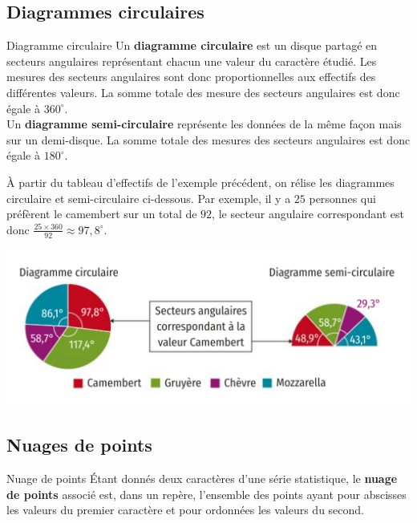 \documentclass[11pt]{article}
\begin{document}
\subsection{Diagrammes circulaires}
\begin{defi}{Diagramme circulaire}
  Un \textbf{diagramme circulaire} est un disque partagé en secteurs angulaires
  représentant chacun une valeur du caractère étudié. Les mesures des secteurs
  angulaires sont donc proportionnelles aux effectifs des différentes valeurs.
  La somme totale des mesure des secteurs angulaires est donc égale à
  $360^\circ$.\\[2mm]
  Un \textbf{diagramme semi-circulaire} représente les données de la même façon
  mais sur un demi-disque. La somme totale des mesures des secteurs angulaires
  est donc égale à $180^\circ$.
\end{defi}

\begin{exemple}
  À partir du tableau d'effectifs de l'exemple précédent, on rélise les
  diagrammes circulaire et semi-circulaire ci-dessous. Par exemple, il y a $25$
  personnes qui préfèrent le camembert sur un total de $92$, le secteur
  angulaire correspondant est donc $\frac{25\times 360}{92}\approx97,8^\circ$.
  \begin{center}
\includegraphics[scale=.4]{pies.png}
  \end{center}
\end{exemple}

\subsection{Nuages de points}
\begin{defi}{Nuage de points}
  Étant donnés deux caractères d'une série statistique, le \textbf{nuage de
  points} associé est, dans un repère, l'ensemble des points ayant pour
  abscisses les valeurs du premier caractère et pour ordonnées les valeurs du
  second.
\end{defi}
\end{document}
